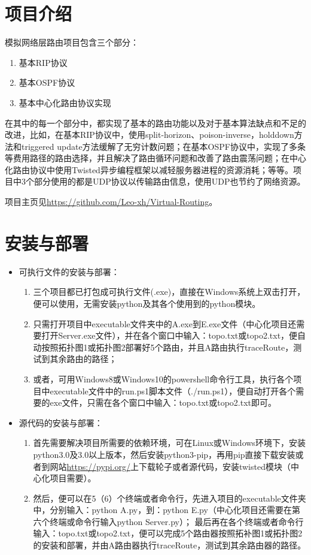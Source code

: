 \documentclass[15pt]{ctexart}
\begin{document}

\tableofcontents
\newpage
\section{项目介绍} %
\label{sec:项目介绍}
	模拟网络层路由项目包含三个部分：
	\begin{enumerate}
		\item 基本RIP协议
		\item 基本OSPF协议
		\item 基本中心化路由协议实现
	\end{enumerate}
	\par 在其中的每一个部分中，都实现了基本的路由功能以及对于基本算法缺点和不足的改进，比如，在基本RIP协议中，使用split-horizon、poison-inverse，holddown方法和triggered update方法缓解了无穷计数问题；在基本OSPF协议中，实现了多条等费用路径的路由选择，并且解决了路由循环问题和改善了路由震荡问题；在中心化路由协议中使用Twisted异步编程框架以减轻服务器进程的资源消耗；等等。项目中3个部分使用的都是UDP协议以传输路由信息，使用UDP也节约了网络资源。
	\par 项目主页见\url{https://github.com/Leo-xh/Virtual-Routing}。




\section{安装与部署} %
\label{sec:安装与部署}
	\begin{itemize}
		\item 可执行文件的安装与部署：
			\begin{enumerate}
				\item 三个项目都已打包成可执行文件(.exe)，直接在Windows系统上双击打开，便可以使用，无需安装python及其各个使用到的python模块。
				\item 只需打开项目中executable文件夹中的A.exe到E.exe文件（中心化项目还需要打开Server.exe文件），并在各个窗口中输入：topo.txt或topo2.txt，便自动按照拓扑图1或拓扑图2部署好5个路由，并且A路由执行traceRoute，测试到其余路由的路径；
				\item 或者，可用Windows8或Windows10的powershell命令行工具，执行各个项目中executable文件中的run.ps1脚本文件（./run.ps1），便自动打开各个需要的exe文件，只需在各个窗口中输入：topo.txt或topo2.txt即可。
			\end{enumerate}
		\item 源代码的安装与部署：
			\begin{enumerate}
				\item 首先需要解决项目所需要的依赖环境，可在Linux或Windows环境下，安装python3.0及3.0以上版本，然后安装python3-pip，再用pip直接下载安装或者到网站\url{https://pypi.org/}上下载轮子或者源代码，安装twisted模块（中心化项目需要）。
				\item 然后，便可以在5（6）个终端或者命令行，先进入项目的executable文件夹中，分别输入：python A.py，到：python E.py（中心化项目还需要在第六个终端或命令行输入python Server.py）；
				最后再在各个终端或者命令行输入：topo.txt或topo2.txt，便可以完成5个路由器按照拓补图1或拓扑图2的安装和部署，并由A路由器执行traceRoute，测试到其余路由器的路径。
			\end{enumerate}
	\end{itemize}
\end{document}
